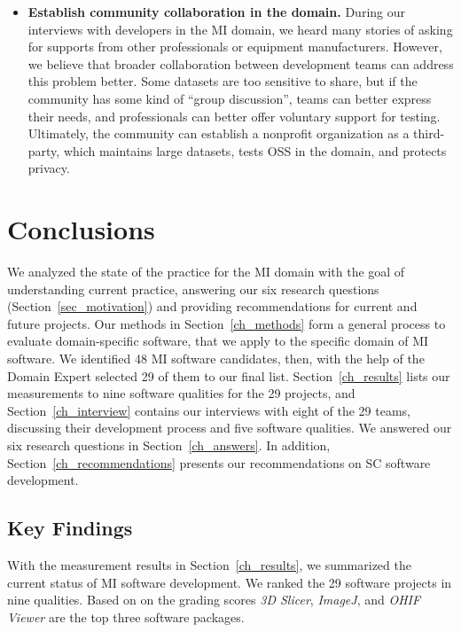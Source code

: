 \documentclass[final, 3p, times, authoryear]{elsarticle}
\begin{document}
\begin{itemize}
\item \textbf{Establish community collaboration in the domain.} During our
interviews with developers in the MI domain, we heard many stories of asking for
supports from other professionals or equipment manufacturers. However, we
believe that broader collaboration between development teams can address this
problem better. Some datasets are too sensitive to share, but if the community
has some kind of ``group discussion'', teams can better express their needs, and
professionals can better offer voluntary support for testing. Ultimately, the
community can establish a nonprofit organization as a third-party, which
maintains large datasets, tests OSS in the domain, and protects privacy. 

\end{itemize}

\section{Conclusions} \label{ch_conclusions}

We analyzed the state of the practice for the MI domain with the goal of
understanding current practice, answering our six research questions
(Section~\ref{sec_motivation}) and providing recommendations for current
and future projects.  Our methods in Section~\ref{ch_methods} form a general
process to evaluate domain-specific software, that we apply to the specific
domain of MI software. We identified 48 MI software candidates, then, with the
help of the Domain Expert selected 29 of them to our final list.
Section~\ref{ch_results} lists our measurements to nine software qualities for
the 29 projects, and Section~\ref{ch_interview} contains our interviews with
eight of the 29 teams, discussing their development process and five software
qualities.  We answered our six research questions in Section~\ref{ch_answers}.
In addition, Section~\ref{ch_recommendations} presents our recommendations on SC
software development.

\subsection{Key Findings}

With the measurement results in Section~\ref{ch_results}, we summarized the
current status of MI software development. We ranked the 29 software projects in
nine qualities.  Based on on the grading scores \textit{3D Slicer},
\textit{ImageJ}, and \textit{OHIF Viewer} are the top three software packages.
\end{document}
